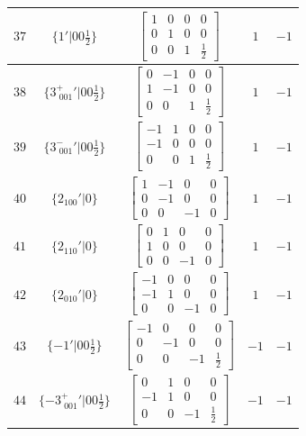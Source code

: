 \documentclass[fleqn,8pt]{jsarticle}
\begin{document}
\begin{longtable}{ccccc}
$ 37 $ & $ \{1{}'|0 0 \frac{1}{2}\} $ & $ \begin{bmatrix} 1 & 0 & 0 & 0 \\ 0 & 1 & 0 & 0 \\ 0 & 0 & 1 & \frac{1}{2} \end{bmatrix} $ & $ 1 $ & $ -1 $ \\ \hline
$ 38 $ & $ \{3^{+}_{\,\,001}{}'|0 0 \frac{1}{2}\} $ & $ \begin{bmatrix} 0 & -1 & 0 & 0 \\ 1 & -1 & 0 & 0 \\ 0 & 0 & 1 & \frac{1}{2} \end{bmatrix} $ & $ 1 $ & $ -1 $ \\ \hline
$ 39 $ & $ \{3^{-}_{\,\,001}{}'|0 0 \frac{1}{2}\} $ & $ \begin{bmatrix} -1 & 1 & 0 & 0 \\ -1 & 0 & 0 & 0 \\ 0 & 0 & 1 & \frac{1}{2} \end{bmatrix} $ & $ 1 $ & $ -1 $ \\ \hline
$ 40 $ & $ \{2{}_{100}{}'|0\} $ & $ \begin{bmatrix} 1 & -1 & 0 & 0 \\ 0 & -1 & 0 & 0 \\ 0 & 0 & -1 & 0 \end{bmatrix} $ & $ 1 $ & $ -1 $ \\ \hline
$ 41 $ & $ \{2{}_{110}{}'|0\} $ & $ \begin{bmatrix} 0 & 1 & 0 & 0 \\ 1 & 0 & 0 & 0 \\ 0 & 0 & -1 & 0 \end{bmatrix} $ & $ 1 $ & $ -1 $ \\ \hline
$ 42 $ & $ \{2{}_{010}{}'|0\} $ & $ \begin{bmatrix} -1 & 0 & 0 & 0 \\ -1 & 1 & 0 & 0 \\ 0 & 0 & -1 & 0 \end{bmatrix} $ & $ 1 $ & $ -1 $ \\ \hline
$ 43 $ & $ \{-1{}'|0 0 \frac{1}{2}\} $ & $ \begin{bmatrix} -1 & 0 & 0 & 0 \\ 0 & -1 & 0 & 0 \\ 0 & 0 & -1 & \frac{1}{2} \end{bmatrix} $ & $ -1 $ & $ -1 $ \\ \hline
$ 44 $ & $ \{-3^{+}_{\,\,001}{}'|0 0 \frac{1}{2}\} $ & $ \begin{bmatrix} 0 & 1 & 0 & 0 \\ -1 & 1 & 0 & 0 \\ 0 & 0 & -1 & \frac{1}{2} \end{bmatrix} $ & $ -1 $ & $ -1 $ \\ \hline

\end{longtable}
\end{document}
